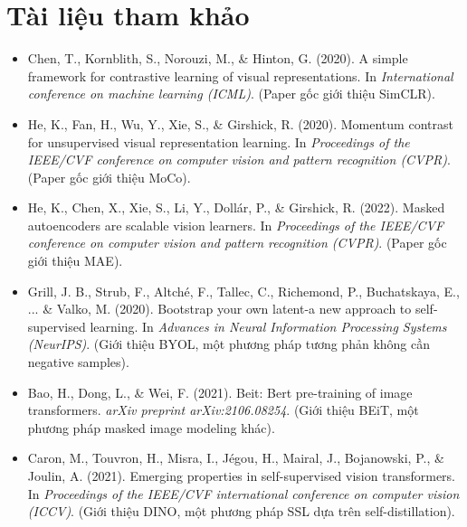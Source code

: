 \section*{Tài liệu tham khảo}
\begin{itemize}
	\item[1] Chen, T., Kornblith, S., Norouzi, M., \& Hinton, G. (2020). A simple framework for contrastive learning of visual representations. In \textit{International conference on machine learning (ICML)}. (Paper gốc giới thiệu SimCLR).
	\item[2] He, K., Fan, H., Wu, Y., Xie, S., \& Girshick, R. (2020). Momentum contrast for unsupervised visual representation learning. In \textit{Proceedings of the IEEE/CVF conference on computer vision and pattern recognition (CVPR)}. (Paper gốc giới thiệu MoCo).
	\item[3] He, K., Chen, X., Xie, S., Li, Y., Dollár, P., \& Girshick, R. (2022). Masked autoencoders are scalable vision learners. In \textit{Proceedings of the IEEE/CVF conference on computer vision and pattern recognition (CVPR)}. (Paper gốc giới thiệu MAE).
	\item[4] Grill, J. B., Strub, F., Altché, F., Tallec, C., Richemond, P., Buchatskaya, E., ... \& Valko, M. (2020). Bootstrap your own latent-a new approach to self-supervised learning. In \textit{Advances in Neural Information Processing Systems (NeurIPS)}. (Giới thiệu BYOL, một phương pháp tương phản không cần negative samples).
	\item[5] Bao, H., Dong, L., \& Wei, F. (2021). Beit: Bert pre-training of image transformers. \textit{arXiv preprint arXiv:2106.08254}. (Giới thiệu BEiT, một phương pháp masked image modeling khác).
	\item[6] Caron, M., Touvron, H., Misra, I., Jégou, H., Mairal, J., Bojanowski, P., \& Joulin, A. (2021). Emerging properties in self-supervised vision transformers. In \textit{Proceedings of the IEEE/CVF international conference on computer vision (ICCV)}. (Giới thiệu DINO, một phương pháp SSL dựa trên self-distillation).
\end{itemize}